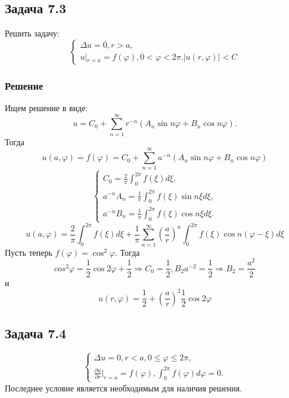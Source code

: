 \documentclass[11pt]{article}
\begin{document}
\subsection{Задача 7.3}
\label{sec:org3fcad91}
Решить задачу:
\begin{equation}
\begin{cases}
\Delta u = 0, r > a, \\
u|_{r = a} = f(\varphi), 0 < \varphi < 2\pi.
|u(r, \varphi)| < C
\end{cases}
\end{equation}
\subsubsection{Решение}
\label{sec:org99bfe6b}
Ищем решение в виде:
\begin{equation}
u = C_0 + \sum_{n = 1}^{\infty}r^{-n}(A_n\sin n\varphi + B_n\cos n\varphi).
\end{equation}
Тогда
\begin{equation}
u(a, \varphi) = f(\varphi) = C_0 + \sum_{n = 1}^{\infty}a^{-n}(A_n\sin n\varphi + B_n\cos n\varphi)
\end{equation}
\begin{equation}
\begin{cases}
C_0 = \frac2{\pi}\int_0^{2\pi}f(\xi)d\xi, \\
a^{-n}A_n = \frac1{\pi}\int_0^{2\pi}f(\xi)\sin n\xi d\xi, \\
a^{-n}B_n = \frac1{\pi}\int_0^{2\pi}f(\xi)\cos n\xi d\xi.
\end{cases}
\end{equation}
\begin{equation}
u(a, \varphi) = \frac2{\pi}\int_0^{2\pi}f(\xi)d\xi + \frac1{\pi}\sum_{n = 1}^{\infty}\left(\frac{a}r\right)^n
\int_0^{2\pi}f(\xi)\cos n(\varphi - \xi)d\xi
\end{equation}
Пусть теперь $f(\varphi) = \cos^2\varphi$. Тогда
\begin{equation}
cos^2\varphi = \frac12\cos2\varphi + \frac12 \Rightarrow C_0 = \frac12, B_2a^{-2} = \frac12 \Rightarrow B_2 = \frac{a^2}2
\end{equation}
и
\begin{equation}
u(r, \varphi) = \frac12 + \left(\frac{a}r\right)^2\frac12\cos2\varphi
\end{equation}
\subsection{Задача 7.4}
\label{sec:org1ad48a6}
\begin{equation}
\begin{cases}
\Delta u = 0, r < a, 0 \leq \varphi \leq 2\pi, \\
\frac{\partial u}{\partial r}|_{r = a} = f(\varphi), \int_0^{2\pi}f(\varphi)d\varphi = 0.
\end{cases}
\end{equation}
Последнее условие является необходимым для наличия решения.
\end{document}
